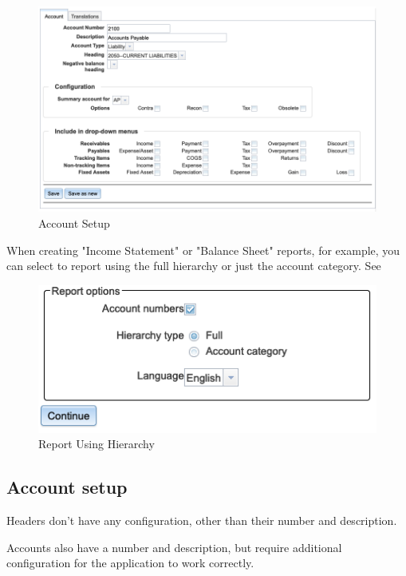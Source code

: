 \begin{figure}[H]
    \centering
    \includegraphics[width=\linewidth]{images/gl-coa.png}
    \caption{Account Setup}
    \label{fig:coa-account-setup}
\end{figure}

When creating "Income Statement"  or "Balance Sheet" reports, for example,  you can select to report using the full hierarchy or just the account category.  See 

\begin{figure}[H]
\centering
\includegraphics[width=\graphicswidth]{images/reports-select-hierarchy.png}
\caption{Report Using Hierarchy}
\label{fig:config-report-hierarchy}
\end{figure}

\subsection{Account setup}
\label{sec-coa-account-setup}

Headers don't have any configuration, other than their number and description. 

Accounts also
have a number and description, but require additional configuration for the application to work
correctly. 


